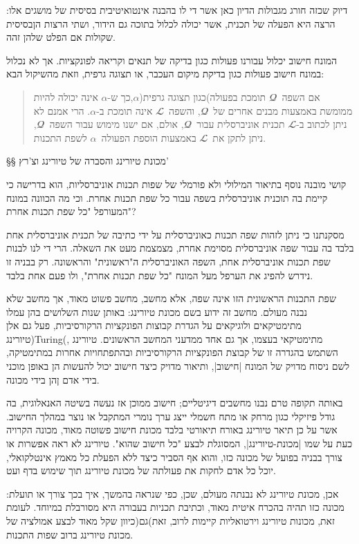 דיוק שכזה חורג מגבולות הדיון כאן אשר די לו בהבנה אינטואיטיבית בסיסית של מושגים
אלו: הרצה היא הפעלה של תכנית, אשר יכולה לכלול בתוכה גם הידור, ושתי הרצות
הןבסיסית שקולות אם הפלט שלהן זהה.

המונח חישוב יכלול עבורנו פעולות כגון בדיקה של תנאים וקריאה לפונקציות. אך לא
נכלול במונח חישוב פעולות כגון בדיקת מיקום העכבר, או תצוגה גרפית, וזאת מהשיקול
הבא:
\begin{quote}
  אם השפה~$𝓠$ תומכת בפעולה)כגון תצוגה גרפית($α$,כך ש-$α$ אינה יכולה להיות
  ממומשת באמצעות מבנים אחרים של~$𝓠$, והשפה~$𝓛$ אינה תומכת ב-$α$. הרי אמנם לא
  ניתן לכתוב ב-$𝓛$ תכנית אוניברסלית עבור~$𝓠$, אולם, אם ישנו מימוש עבור
  השפה~$𝓠$, ניתן לתקן את~$𝓛$ באמצעות הוספת הפעולה~$α$ לשפת התכנות.
\end{quote}

§§ מכונת טיורינג והסברה של טיורינג וצ'רץ'

קושי מובנה נוסף בתיאור המילולי ולא פורמלי של שפות תכנות אוניברסליות, הוא בדרישה
כי קיימת בה תוכנית אוניברסלית בשפה עבור כל שפת תכנות אחרת. וכי מה הכוונה במונח
המעורפל "כל שפת תכנות אחרת"?

מסקנתנו כי ניתן לזהות שפה תכנות כאוניברסלית על ידי כתיבה של תכנית אוניברסלית
אחת בלבד בה עבור שפה אוניברסלית מסוימת אחרת, מצמצמת מעט את השאלה. הרי די לנו
לבנות שפת תכנות אוניברסלית אחת, השפה האוניברסלית ה"ראשונית" והראשונה. רק בבניה
זו נידרש להפיג את הערפל מעל המונח "כל שפת תכנות אחרת", ולו פעם אחת בלבד.

שפת התכנות הראשונית הזו אינה שפה, אלא מחשב, מחשב פשוט מאוד, אך מחשב שלא נבנה
מעולם. מחשב זה ידוע בשם מכונת טיורינג: באותן שנות השלושים בהן עמלו מתימטיקאים
ולוגיקאים על הגדרת קבוצות הפונקציות הרקורסיביות, פעל גם אלן טיורינג)Turing(,
מתימטיקאי בעצמו, אך גם אחד ממדעני המחשב הראשונים. טיורינג השתמש בהגדרה זו של
קבוצת הפונקציות הרקורסיביות ובהתפתחויות אחרות במתימטיקה, לשם ניסוח מדויק של
המונח \ע|חישוב|, ותיאור מדויק כיצד חישוב יכול להעשות הן באופן מוכני בידי אדם
ןהן בידי מכונה.

באותה תקופה טרם נבנו מחשבים דיגיטליים; חישוב ממוכן אז נעשה בשיטה האנאלוגית,
בה גודל פיזיקלי כגון מרחק או מתח חשמלי ייצג ערך נומרי המתקבל או נוצר במהלך
החישוב. אשר על כן תיאר טיורינג באורח תיאורטי בלבד מכונת חישוב פשוטה מאוד, מכונה
הקרויה כעת על שמו \ע|מכונת-טיורינג|, המסוגלת לבצע "כל חישוב שהוא". טיורינג לא
ראה אפשרות או צורך בבניה בפועל של מכונה כזו, והוא אף הסביר כיצד ללא הפעלת כל
מאמץ אינטלקואלי, יוכל כל אדם לחקות את פעולתה של מכונת טיורינג תוך שימוש בדף
ועט.

אכן, מכונת טיורינג לא נבנתה מעולם, שכן, כפי שנראה בהמשך, איך בכך צורך או תועלת:
מכונה כזו תהיה בהכרח איטית מאוד, וכתיבת תכניות בעבורה היא מסורבלת במיוחד. לעומת
זאת, מכונות טיורינג וירטואליות קיימות לרוב, זאת)גם(כיוון שקל מאוד לבצע אמולציה
של מכונת טיורינג ברוב שפות התכנות.

